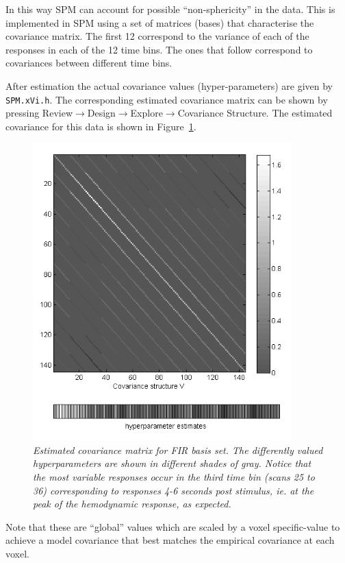 In this way SPM can account for possible ``non-sphericity'' in the data. This is implemented in SPM using a set of matrices (bases) that characterise the covariance matrix. The first 12 correspond to the variance of each of the responses in each of the 12 time bins. The ones that follow  correspond to covariances between different time bins.

After estimation the actual covariance values (hyper-parameters) are given by \texttt{SPM.xVi.h}. The corresponding estimated covariance matrix can be shown by pressing Review$\rightarrow$Design$\rightarrow$Explore$\rightarrow$Covariance Structure. The estimated covariance for this data is shown in Figure~\ref{fir_covariance}.
\begin{figure}
\begin{center}
\includegraphics[width=100mm]{faces_group/fir_covariance}
\caption{\em Estimated covariance matrix for FIR basis set. The differently valued hyperparameters are shown in different shades of gray. Notice that the most variable responses occur in the third time bin (scans 25 to 36) corresponding to responses 4-6 seconds post stimulus, ie. at the peak of the hemodynamic response, as expected. \label{fir_covariance}}
\end{center}
\end{figure}
Note that these are ``global'' values which are scaled by a voxel specific-value to achieve a model covariance that best matches the empirical covariance at each voxel. 

